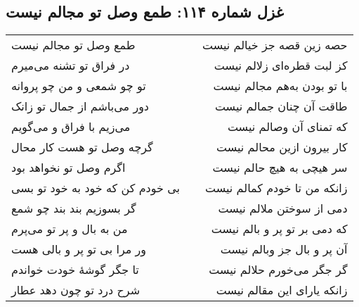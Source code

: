\begin{center}
\section*{غزل شماره ۱۱۴: طمع وصل تو مجالم نیست}
\label{sec:114}
\begin{longtable}{l p{0.5cm} r}
طمع وصل تو مجالم نیست
&&
حصه زین قصه جز خیالم نیست
\\
در فراق تو تشنه می‌میرم
&&
کز لبت قطره‌ای زلالم نیست
\\
تو چو شمعی و من چو پروانه
&&
با تو بودن به‌هم مجالم نیست
\\
دور می‌باشم از جمال تو زانک
&&
طاقت آن چنان جمالم نیست
\\
می‌زیم با فراق و می‌گویم
&&
که تمنای آن وصالم نیست
\\
گرچه وصل تو هست کار محال
&&
کار بیرون ازین محالم نیست
\\
اگرم وصل تو نخواهد بود
&&
سر هیچی به هیچ حالم نیست
\\
بی خودم کن که خود به خود تو بسی
&&
زانکه من تا خودم کمالم نیست
\\
گر بسوزیم بند بند چو شمع
&&
دمی از سوختن ملالم نیست
\\
من به بال و پر تو می‌پرم
&&
که دمی بر تو پر و بالم نیست
\\
ور مرا بی تو پر و بالی هست
&&
آن پر و بال جز وبالم نیست
\\
تا جگر گوشهٔ خودت خواندم
&&
گر جگر می‌خورم حلالم نیست
\\
شرح درد تو چون دهد عطار
&&
زانکه یارای این مقالم نیست
\\
\end{longtable}
\end{center}
